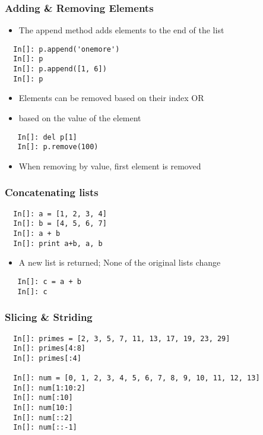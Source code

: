 \begin{frame}[fragile]
  \frametitle{Adding \& Removing Elements}
  \begin{itemize}
  \item The append method adds elements to the end of the list
  \end{itemize}
  \begin{lstlisting}
  In[]: p.append('onemore')
  In[]: p
  In[]: p.append([1, 6])
  In[]: p
  \end{lstlisting}
  \begin{itemize}
  \item Elements can be removed based on their index OR
  \item based on the value of the element
  \end{itemize}
  \begin{lstlisting}
   In[]: del p[1]
   In[]: p.remove(100)
  \end{lstlisting}
  \begin{itemize}
  \item \alert{When removing by value, first element is removed}
  \end{itemize}
\end{frame}


\begin{frame}[fragile]
  \frametitle{Concatenating lists}
  \begin{lstlisting}
  In[]: a = [1, 2, 3, 4]
  In[]: b = [4, 5, 6, 7]
  In[]: a + b
  In[]: print a+b, a, b
  \end{lstlisting}
  \begin{itemize}
  \item A new list is returned; None of the original lists change
  \end{itemize}
  \begin{lstlisting}
   In[]: c = a + b
   In[]: c
  \end{lstlisting}
\end{frame}

\begin{frame}[fragile]
  \frametitle{Slicing \& Striding}
  \begin{lstlisting}
  In[]: primes = [2, 3, 5, 7, 11, 13, 17, 19, 23, 29]
  In[]: primes[4:8]
  In[]: primes[:4]

  In[]: num = [0, 1, 2, 3, 4, 5, 6, 7, 8, 9, 10, 11, 12, 13]
  In[]: num[1:10:2]
  In[]: num[:10]
  In[]: num[10:]
  In[]: num[::2]
  In[]: num[::-1]
  \end{lstlisting}
\end{frame}

